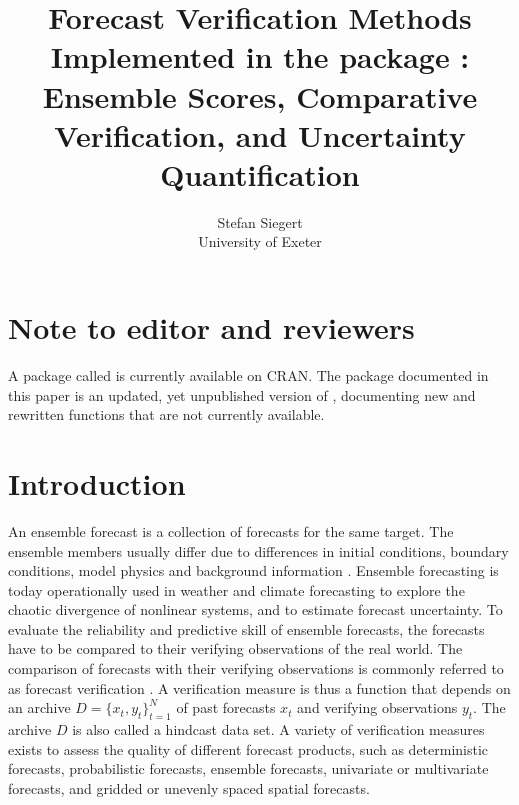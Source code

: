 \documentclass[article]{jss}\usepackage{graphicx, color}
\author{Stefan Siegert\\University of Exeter}
\title{Forecast Verification Methods Implemented in the \proglang{R} package \pkg{SpecsVerification}: Ensemble Scores, Comparative Verification, and Uncertainty Quantification}
\begin{document}

\section*{Note to editor and reviewers}

A package called  is currently available on CRAN.
The package documented in this paper is an updated, yet unpublished version of , documenting new and rewritten functions that are not currently available.



\section{Introduction}

An ensemble forecast is a collection of forecasts for the same target.
The ensemble members usually differ due to differences in initial conditions, boundary conditions, model physics and background information \citep{gneiting2005atmospheric, leutbecher2008ensemble}.
Ensemble forecasting is today operationally used in weather and climate forecasting to explore the chaotic divergence of nonlinear systems, and to estimate forecast uncertainty.
To evaluate the reliability and predictive skill of ensemble forecasts, the forecasts have to be compared to their verifying observations of the real world.
%
The comparison of forecasts with their verifying observations is commonly referred to as forecast verification \citep{jolliffe2012forecast}.
A verification measure is thus a function that depends on an archive $D=\{x_t, y_t\}_{t=1}^N$ of past forecasts $x_t$ and verifying observations $y_t$.
The archive $D$ is also called a hindcast data set.
A variety of verification measures exists to assess the quality of different forecast products, such as deterministic forecasts, probabilistic forecasts, ensemble forecasts, univariate or multivariate forecasts, and gridded or unevenly spaced spatial forecasts.
\end{document}
